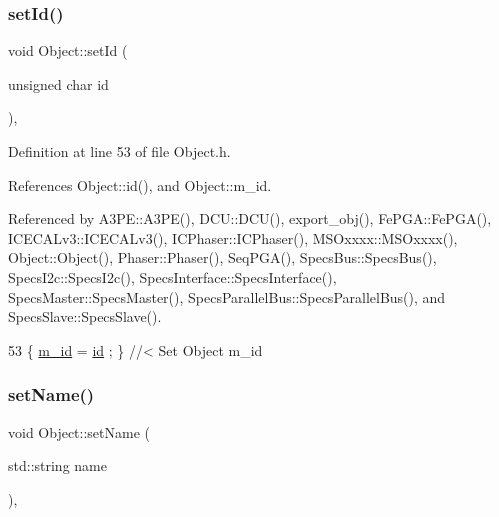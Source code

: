 \subsubsection{\texorpdfstring{set\+Id()}{setId()}}
{\footnotesize\ttfamily void Object\+::set\+Id (\begin{DoxyParamCaption}\item[{unsigned char}]{id }\end{DoxyParamCaption})\hspace{0.3cm}{\ttfamily [inline]}, {\ttfamily [inherited]}}



Definition at line 53 of file Object.\+h.



References Object\+::id(), and Object\+::m\+\_\+id.



Referenced by A3\+P\+E\+::\+A3\+P\+E(), D\+C\+U\+::\+D\+C\+U(), export\+\_\+obj(), Fe\+P\+G\+A\+::\+Fe\+P\+G\+A(), I\+C\+E\+C\+A\+Lv3\+::\+I\+C\+E\+C\+A\+Lv3(), I\+C\+Phaser\+::\+I\+C\+Phaser(), M\+S\+Oxxxx\+::\+M\+S\+Oxxxx(), Object\+::\+Object(), Phaser\+::\+Phaser(), Seq\+P\+G\+A(), Specs\+Bus\+::\+Specs\+Bus(), Specs\+I2c\+::\+Specs\+I2c(), Specs\+Interface\+::\+Specs\+Interface(), Specs\+Master\+::\+Specs\+Master(), Specs\+Parallel\+Bus\+::\+Specs\+Parallel\+Bus(), and Specs\+Slave\+::\+Specs\+Slave().


\begin{DoxyCode}
53 \{ \hyperlink{classObject_aca74b9dbfed7b5556ea2d56c65b6b6b0}{m\_id}    = \hyperlink{classObject_af99145335cc61ff6e2798ea17db009d2}{id}    ; \} \textcolor{comment}{//< Set Object m\_id}
\end{DoxyCode}
\mbox{\label{classObject_ae30fea75683c2d149b6b6d17c09ecd0c}} 
\subsubsection{\texorpdfstring{set\+Name()}{setName()}}
{\footnotesize\ttfamily void Object\+::set\+Name (\begin{DoxyParamCaption}\item[{std\+::string}]{name }\end{DoxyParamCaption})\hspace{0.3cm}{\ttfamily [inline]}, {\ttfamily [inherited]}}



